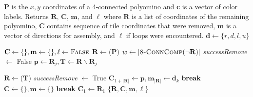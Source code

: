 \begin{algorithm}
\newcommand\algotext[1]{\end{algorithmic}#1\begin{algorithmic}[1]}
\caption{($\mathbf{P},\mathbf{c})$   \label{alg:Erode}}
$\mathbf{P}$ is the $x,y$ coordinates of a 4-connected polyomino  and $ \mathbf{c} $ is a vector of color labels.
Returns $ \mathbf{R} $, $ \mathbf{C} $, $\mathbf{m}$, and $\mathbf{\ell}$ where $ \mathbf{R} $  is a list of coordinates of the remaining polyomino, $ \mathbf{C} $ contains sequence of tile coordinates that were removed,   $\mathbf{m}$ is a vector of directions for assembly, and $\mathbf{\ell}$ if loops were encountered. $\mathbf{d} \gets\{r,d,l,u\}$
\begin{algorithmic}[1]

\State\hbox{$\mathbf{C} \leftarrow \{\}, \mathbf{m} \leftarrow \{\}, \mathbf{\ell} \gets \textrm{\sc False}$}
\State\hbox{$ \mathbf{R}\leftarrow${}($\mathbf{P}$)}
\State $w \gets |\text{\sc 8-ConnComp}(\neg\mathbf{R})|$ 
\State  \emph{successRemove} $\gets$ {\sc False}
\State $\mathbf{p} \gets \mathbf{R}_j,  \mathbf{T} \gets  \mathbf{R}  \backslash   \mathbf{R}_j$

\State\hbox{$ \mathbf{R}\leftarrow${}($\mathbf{T}$)}
\State\emph{successRemove} $\gets$ {\sc True}
\State  $\mathbf{C}_{ 1+|\mathbf{R}|} \gets \mathbf{p},  \mathbf{m}_{ |\mathbf{R}|}  \gets \mathbf{d}_k$
\EndIf
\State \textbf{break}
\EndIf
\EndFor
\EndFor
{}
\State  \hbox{$\mathbf{C} \leftarrow \{\}, \mathbf{m} \leftarrow \{\}$}
\State \textbf{break}
\EndIf
\EndFor
{}
\State  $\mathbf{C}_{ 1} \gets \mathbf{R}_1 $
\EndIf
\State \Return $\{ \mathbf{R},\mathbf{C}, \mathbf{m}, \ell \}$ 
\end{algorithmic}
\end{algorithm} 









